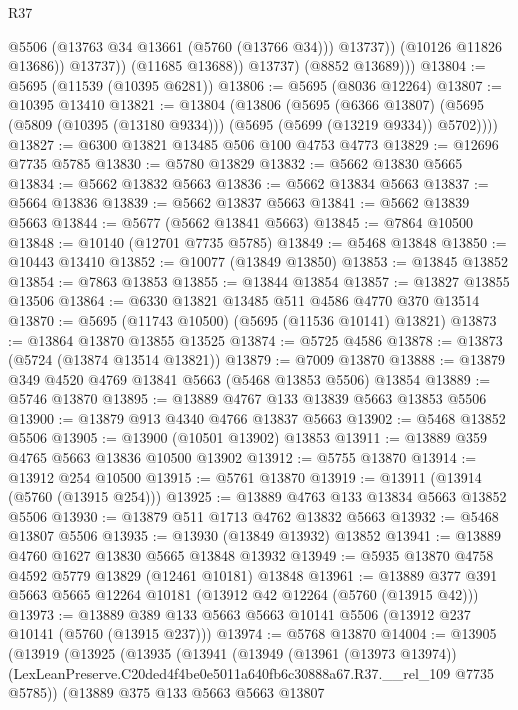 \begin{lexlean}{R37}
\begin{coremodule}
                      @5506
                      (@13763 @34 @13661 (@5760 (@13766 @34)))
                      @13737))
                  (@10126 @11826 @13686))
                @13737))
            (@11685 @13688))
          @13737)
        (@8852 @13689)))
@13804 := @5695 (@11539 (@10395 @6281))
@13806 := @5695 (@8036 @12264)
@13807 := @10395 @13410
@13821 := @13804
    (@13806
      (@5695
        (@6366 @13807)
        (@5695 (@5809 (@10395 (@13180 @9334))) (@5695 (@5699 (@13219 @9334)) @5702))))
@13827 := @6300 @13821 @13485 @506 @100 @4753 @4773
@13829 := @12696 @7735 @5785
@13830 := @5780 @13829
@13832 := @5662 @13830 @5665
@13834 := @5662 @13832 @5663
@13836 := @5662 @13834 @5663
@13837 := @5664 @13836
@13839 := @5662 @13837 @5663
@13841 := @5662 @13839 @5663
@13844 := @5677 (@5662 @13841 @5663)
@13845 := @7864 @10500
@13848 := @10140 (@12701 @7735 @5785)
@13849 := @5468 @13848
@13850 := @10443 @13410
@13852 := @10077 (@13849 @13850)
@13853 := @13845 @13852
@13854 := @7863 @13853
@13855 := @13844 @13854
@13857 := @13827 @13855 @13506
@13864 := @6330 @13821 @13485 @511 @4586 @4770 @370 @13514
@13870 := @5695 (@11743 @10500) (@5695 (@11536 @10141) @13821)
@13873 := @13864 @13870 @13855 @13525
@13874 := @5725 @4586
@13878 := @13873 (@5724 (@13874 @13514 @13821))
@13879 := @7009 @13870
@13888 := @13879 @349 @4520 @4769 @13841 @5663 (@5468 @13853 @5506) @13854
@13889 := @5746 @13870
@13895 := @13889 @4767 @133 @13839 @5663 @13853 @5506
@13900 := @13879 @913 @4340 @4766 @13837 @5663
@13902 := @5468 @13852 @5506
@13905 := @13900 (@10501 @13902) @13853
@13911 := @13889 @359 @4765 @5663 @13836 @10500 @13902
@13912 := @5755 @13870
@13914 := @13912 @254 @10500
@13915 := @5761 @13870
@13919 := @13911 (@13914 (@5760 (@13915 @254)))
@13925 := @13889 @4763 @133 @13834 @5663 @13852 @5506
@13930 := @13879 @511 @1713 @4762 @13832 @5663
@13932 := @5468 @13807 @5506
@13935 := @13930 (@13849 @13932) @13852
@13941 := @13889 @4760 @1627 @13830 @5665 @13848 @13932
@13949 := @5935 @13870 @4758 @4592 @5779 @13829 (@12461 @10181) @13848
@13961 := @13889 @377 @391 @5663 @5665 @12264 @10181 (@13912 @42 @12264 (@5760 (@13915 @42)))
@13973 := @13889 @389 @133 @5663 @5663 @10141 @5506 (@13912 @237 @10141 (@5760 (@13915 @237)))
@13974 := @5768 @13870
@14004 := @13905
    (@13919
      (@13925
        (@13935
          (@13941
            (@13949
              (@13961 (@13973 @13974))
              (LexLeanPreserve.C20ded4f4be0e5011a640fb6c30888a67.R37.__rel_109 @7735 @5785))
            (@13889
              @375
              @133
              @5663
              @5663
              @13807

\end{coremodule}
\end{lexlean}
